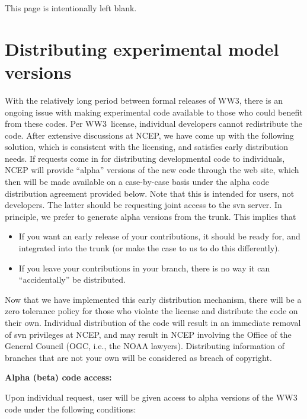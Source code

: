 \documentclass[12pt]{article}
\newcommand{\ws}{WW3}
\newcommand{\pb}{\strut \vfill \pagebreak}
\newcommand{\bpage}{\vfill \pagebreak \strut

\vspace{2.5in} \centerline{This page is intentionally left blank.}}
\newcommand{\newsec}{\setcounter{equation}{0}
                      \setcounter{myfigno}{0}
                      \setcounter{mytabno}{0}}
\newcounter{myfigno}[section]
\newcounter{mytabno}[section]
\begin{document}
\bpage
\pb
\section{Distributing experimental model versions} \label{sec:dist}
\newsec

With the relatively long period between formal releases of \ws, there is an
ongoing issue with making experimental code available to those who could
benefit from these codes.  Per \ws\ license, individual developers cannot
redistribute the code. After extensive discussions at NCEP, we have come up
with the following solution, which is consistent with the licensing, and
satisfies early distribution needs. If requests come in for distributing
developmental code to individuals, NCEP will provide ``alpha'' versions of the
new code through the web site, which then will be made available on a
case-by-case basis under the alpha code distribution agreement provided
below. Note that this is intended for users, not developers. The latter should
be requesting joint access to the svn server. In principle, we prefer to
generate alpha versions from the trunk. This implies that 

\begin{itemize}
\item If you want an early release of your contributions, it should be ready
  for, and integrated into the trunk (or make the case to us to do this
  differently).
\item If you leave your contributions in your branch, there is no
  way it can ``accidentally'' be distributed.  
\end{itemize}

\noindent
Now that we have implemented this early distribution mechanism, there will be
a zero tolerance policy for those who violate the license and distribute the
code on their own. Individual distribution of the code will result in an
immediate removal of svn privileges at NCEP, and may result in NCEP involving
the Office of the General Council (OGC, i.e., the NOAA lawyers). Distributing
information of branches that are not your own will be considered as breach of
copyright.

\vspace{\baselineskip} \noindent
{\bf Alpha (beta) code access: }

\vspace{\baselineskip} \noindent 
Upon individual request, user will be given access to alpha versions of the
WW3 code under the following conditions: 
\end{document}
